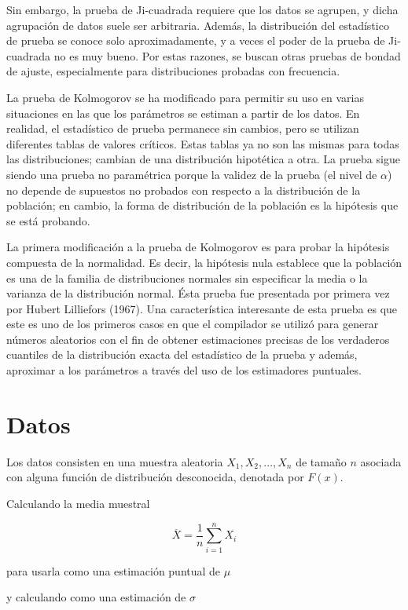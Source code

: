 \documentclass[
  a4paper,
  oneside,
  openany]{book}
\begin{document}
Sin embargo, la prueba de Ji-cuadrada requiere que los datos se agrupen, y dicha agrupación de datos suele ser arbitraria. Además, la distribución del estadístico de prueba se conoce solo aproximadamente, y a veces el poder de la prueba de Ji-cuadrada no es muy bueno. Por estas razones, se buscan otras pruebas de bondad de ajuste, especialmente para distribuciones probadas con frecuencia.

La prueba de Kolmogorov se ha modificado para permitir su uso en varias situaciones en las que los parámetros se estiman a partir de los datos. En realidad, el estadístico de prueba permanece sin cambios, pero se utilizan diferentes tablas de valores críticos. Estas tablas ya no son las mismas para todas las distribuciones; cambian de una distribución hipotética a otra. La prueba sigue siendo una prueba no paramétrica porque la validez de la prueba (el nivel de \(\alpha\)) no depende de supuestos no probados con respecto a la distribución de la población; en cambio, la forma de distribución de la población es la hipótesis que se está probando.

La primera modificación a la prueba de Kolmogorov es para probar la hipótesis compuesta de la normalidad. Es decir, la hipótesis nula establece que la población es una de la familia de distribuciones normales sin especificar la media o la varianza de la distribución normal. Ésta prueba fue presentada por primera vez por Hubert Lilliefors (1967). Una característica interesante de esta prueba es que este es uno de los primeros casos en que el compilador se utilizó para generar números aleatorios con el fin de obtener estimaciones precisas de los verdaderos cuantiles de la distribución exacta del estadístico de la prueba y además, aproximar a los parámetros a través del uso de los estimadores puntuales.

\hypertarget{datos-16}{%
\section{Datos}\label{datos-16}}

Los datos consisten en una muestra aleatoria \(X_{1},X_{2},\ldots,X_{n}\) de tamaño \(n\) asociada con alguna función de distribución desconocida, denotada por \(F(x)\).

Calculando la media muestral

\[\overline{X}=\frac{1}{n}\sum_{i=1}^{n}X_{i}\]

para usarla como una estimación puntual de \(\mu\)

y calculando como una estimación de \(\sigma\)
\end{document}
